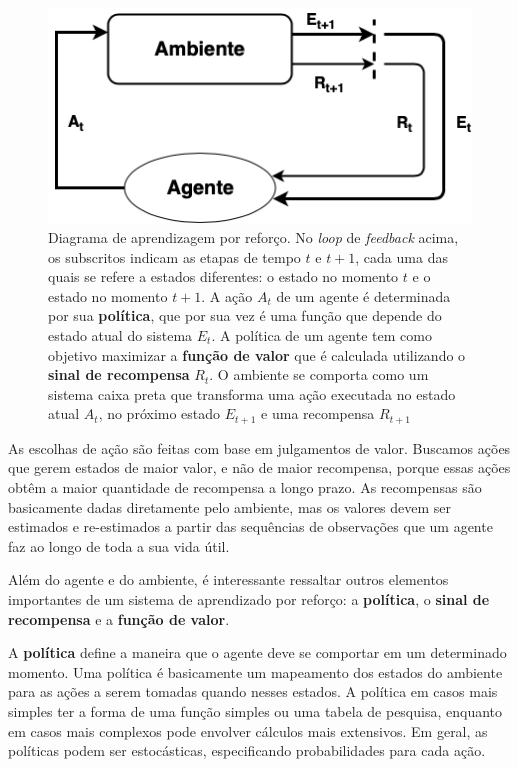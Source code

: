  \begin{figure}[h]
  \centering
  \includegraphics[width=.6 \textwidth]{conteudo/imgs/rl-diagram.png}
  \caption[Diagrama de aprendizagem por reforço]{Diagrama de aprendizagem por reforço. No \textit{loop} de \textit{feedback} acima, os subscritos indicam as etapas de tempo $t$ e $t + 1$, cada uma das quais se refere a estados diferentes: o estado no momento $t$ e o estado no momento $t + 1$. 
  A ação $A_t$ de um agente é determinada por sua \textbf{política}, que por sua vez é uma função que depende do estado atual do sistema $E_t$. A política de um agente tem como objetivo maximizar a \textbf{função de valor} que é calculada utilizando o \textbf{sinal de recompensa} $R_t$. O ambiente se comporta como um sistema caixa preta que transforma uma ação executada no estado atual $A_t$, no próximo estado $E_{t+1}$ e uma recompensa $R_{t+1}$
  }
  \label{rl-diagram}
 \end{figure}

 As escolhas de ação são feitas com base em julgamentos de valor.
 Buscamos ações que gerem estados de maior valor, e não de maior recompensa, porque essas ações obtêm a maior quantidade de recompensa a longo prazo. 
 As recompensas são basicamente dadas diretamente pelo ambiente, mas os valores devem ser estimados e re-estimados a partir das sequências de observações que um agente faz ao longo de toda a sua vida útil.

 Além do agente e do ambiente, é interessante ressaltar outros elementos importantes de um sistema de aprendizado por reforço: a \textbf{política}, o \textbf{sinal de recompensa} e a \textbf{função de valor}.

 A \textbf{política} define a maneira que o agente deve se comportar em um determinado momento. 
 Uma política é basicamente um mapeamento dos estados do ambiente para as ações a serem tomadas quando nesses estados. 
 A política em casos mais simples ter a forma de uma função simples ou uma tabela de pesquisa, enquanto em casos mais complexos pode envolver cálculos mais extensivos. 
 Em geral, as políticas podem ser estocásticas, especificando probabilidades para cada ação.

